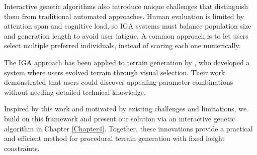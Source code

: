 Interactive genetic algorithms also introduce unique challenges that distinguish them from traditional automated approaches. Human evaluation is limited by attention span and cognitive load, so IGA systems must balance population size and generation length to avoid user fatigue. A common approach is to let users select multiple preferred individuals, instead of scoring each one numerically.

The IGA approach has been applied to terrain generation by \textcite{Walsh10}, who developed a system where users evolved terrain through visual selection. Their work demonstrated that users could discover appealing parameter combinations without needing detailed technical knowledge. 


\hfill

Inspired by this work and motivated by existing challenges and limitations, we build on this framework and present our solution via an interactive genetic algorithm in Chapter \ref{Chapter4}. Together, these innovations provide a practical and efficient method for procedural terrain generation with fixed height constraints.


